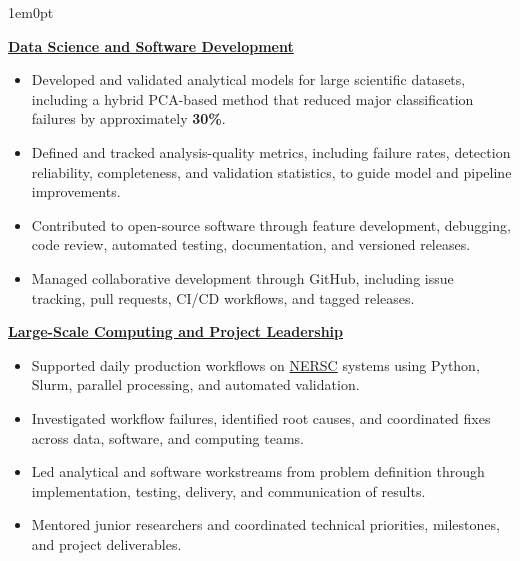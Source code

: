 \documentclass[a4paper,10pt]{article}
\begin{document}
\vspace{1.5mm}
\begin{adjustwidth}{1em}{0pt}

\textcolor{sectionblue}{\textbf{\underline{Data Science and Software Development}}}
\begin{itemize}[leftmargin=*, itemsep=2pt]
    \item Developed and validated analytical models for large scientific datasets, including a hybrid PCA-based method that reduced major classification failures by approximately \textbf{30\%}.
    \item Defined and tracked analysis-quality metrics, including failure rates, detection reliability, completeness, and validation statistics, to guide model and pipeline improvements.
    \item Contributed to open-source software through feature development, debugging, code review, automated testing, documentation, and versioned releases.
    \item Managed collaborative development through GitHub, including issue tracking, pull requests, CI/CD workflows, and tagged releases.
\end{itemize}

\vspace{0.5mm}
\textcolor{sectionblue}{\textbf{\underline{Large-Scale Computing and Project Leadership}}}
\begin{itemize}[leftmargin=*, itemsep=2pt]
    \item Supported daily production workflows on \href{https://www.nersc.gov/}{NERSC} systems using Python, Slurm, parallel processing, and automated validation.
    \item Investigated workflow failures, identified root causes, and coordinated fixes across data, software, and computing teams.
    \item Led analytical and software workstreams from problem definition through implementation, testing, delivery, and communication of results.
    \item Mentored junior researchers and coordinated technical priorities, milestones, and project deliverables.
\end{itemize}
\end{adjustwidth}

\vspace{2mm}
\end{document}
